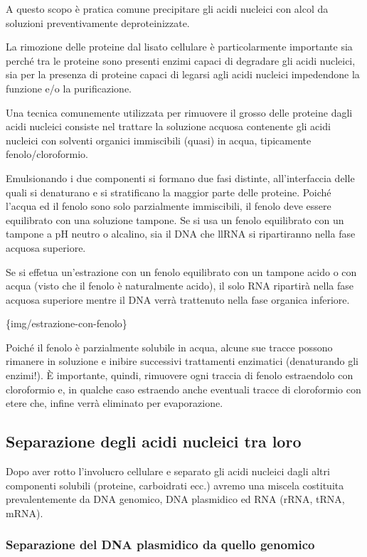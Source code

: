 \documentclass[]{article}
\begin{document}
A questo scopo è pratica comune precipitare gli acidi nucleici con alcol
da soluzioni preventivamente deproteinizzate.

La rimozione delle proteine dal lisato cellulare è particolarmente
importante sia perché tra le proteine sono presenti enzimi capaci di
degradare gli acidi nucleici, sia per la presenza di proteine capaci di
legarsi agli acidi nucleici impedendone la funzione e/o la
purificazione.

Una tecnica comunemente utilizzata per rimuovere il grosso delle
proteine dagli acidi nucleici consiste nel trattare la soluzione acquosa
contenente gli acidi nucleici con solventi organici immiscibili (quasi)
in acqua, tipicamente fenolo/cloroformio.

Emulsionando i due componenti si formano due fasi distinte,
all'interfaccia delle quali si denaturano e si stratificano la maggior
parte delle proteine. Poiché l'acqua ed il fenolo sono solo parzialmente
immiscibili, il fenolo deve essere equilibrato con una soluzione
tampone. Se si usa un fenolo equilibrato con un tampone a pH neutro o
alcalino, sia il DNA che llRNA si ripartiranno nella fase acquosa
superiore.

Se si effetua un'estrazione con un fenolo equilibrato con un tampone
acido o con acqua (visto che il fenolo è naturalmente acido), il solo
RNA ripartirà nella fase acquosa superiore mentre il DNA verrà
trattenuto nella fase organica inferiore.

\{img/estrazione-con-fenolo\}

Poiché il fenolo è parzialmente solubile in acqua, alcune sue tracce
possono rimanere in soluzione e inibire successivi trattamenti
enzimatici (denaturando gli enzimi!). È importante, quindi, rimuovere
ogni traccia di fenolo estraendolo con cloroformio e, in qualche caso
estraendo anche eventuali tracce di cloroformio con etere che, infine
verrà eliminato per evaporazione.

\subsection{Separazione degli acidi nucleici tra
loro}\label{separazione-degli-acidi-nucleici-tra-loro}

Dopo aver rotto l'involucro cellulare e separato gli acidi nucleici
dagli altri componenti solubili (proteine, carboidrati ecc.) avremo una
miscela costituita prevalentemente da DNA genomico, DNA plasmidico ed
RNA (rRNA, tRNA, mRNA).

\subsubsection{Separazione del DNA plasmidico da quello
genomico}\label{separazione-del-dna-plasmidico-da-quello-genomico}
\end{document}

